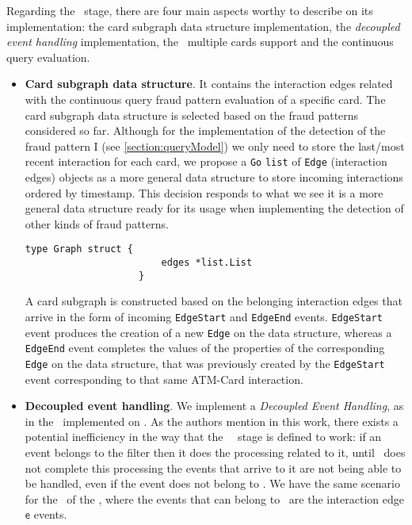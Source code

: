 Regarding the \filter\ stage, there are four main aspects worthy to describe on its implementation: the card subgraph data structure implementation, the \emph{decoupled event handling} implementation, the \filter\ multiple cards support and the continuous query evaluation.
\begin{itemize}
    \item \textbf{Card subgraph data structure}. It contains the interaction edges related with the continuous query fraud pattern evaluation of a specific card.
    The card subgraph data structure is selected based on the fraud patterns considered so far. Although for the implementation of the detection of the fraud pattern I (see \ref{section:queryModel}) we only need to store the last/most recent interaction for each card, we propose a \texttt{Go} \texttt{list} of \texttt{Edge} (interaction edges) objects as a more general data structure to store incoming interactions ordered by timestamp. This decision responds to what we see it is a more general data structure ready for its usage when implementing the detection of other kinds of fraud patterns.\\ 

    \begin{center}
    \lstset{style=golangStyle}
    \begin{lstlisting}[caption={Card subgraph data structure in Go}]
                    type Graph struct {
                    	edges *list.List 
                    }
    \end{lstlisting}
    \end{center}

    A card subgraph is constructed based on the belonging interaction edges that arrive in the form of incoming \texttt{EdgeStart} and \texttt{EdgeEnd} events. \texttt{EdgeStart} event  produces the creation of a new \texttt{Edge} on the data structure, whereas a \texttt{EdgeEnd} event completes the values of the properties of the corresponding \texttt{Edge} on the data structure, that was previously created by the \texttt{EdgeStart} event corresponding to that same ATM-Card interaction.

    \item \textbf{Decoupled event handling}. We implement a \emph{Decoupled Event Handling}, as in the \DP\ implemented on \cite{DP-Benedi_Garcia_2024}. As the authors mention in this work, there exists a potential inefficiency in the way that the \filter\ \F\ stage is defined to work: if an event belongs to the filter then it does the processing related to it, until \F\ does not complete this processing the events that arrive to it are not being able to be handled, even if the event does not belong to \F. We have the same scenario for the \DP\ of the \DPATM, where the events that can belong to \F\ are the interaction edge $\mathsf{e}$ events.\\


\end{itemize}
